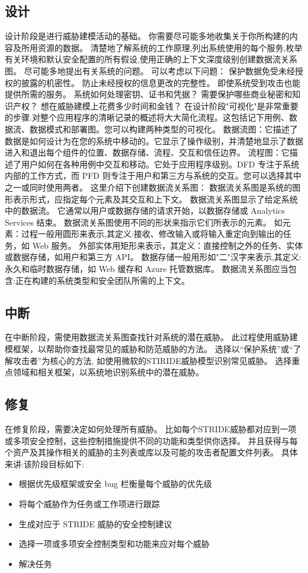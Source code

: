 \subsection[]{设计}
设计阶段是进行威胁建模活动的基础。 你需要尽可能多地收集关于你所构建的内容及所用资源的数据。
清楚地了解系统的工作原理,列出系统使用的每个服务,枚举有关环境和默认安全配置的所有假设,使用正确的上下文深度级别创建数据流关系图。
尽可能多地提出有关系统的问题。 可以考虑以下问题：
保护数据免受未经授权的披露的机密性。
防止未经授权的信息更改的完整性。
即使系统受到攻击也能提供所需的服务。
系统如何处理密钥、证书和凭据？
需要保护哪些商业秘密和知识产权？
想在威胁建模上花费多少时间和金钱？
\newline
在设计阶段"可视化"是非常重要的步骤.对整个应用程序的清晰记录的概述将大大简化流程。这包括记下用例、数据流、数据模式和部署图。您可以构建两种类型的可视化。
数据流图：它描述了数据是如何设计为在您的系统中移动的。它显示了操作级别，并清楚地显示了数据进入和退出每个组件的位置、数据存储、流程、交互和信任边界。 
流程图：它描述了用户如何在各种用例中交互和移动。它处于应用程序级别。DFD 专注于系统内部的工作方式，而 PFD 则专注于用户和第三方与系统的交互。您可以选择其中之一或同时使用两者。
这里介绍下创建数据流关系图： 数据流关系图是系统的图形表示形式，应指定每个元素及其交互和上下文。
数据流关系图显示了给定系统中的数据流。 它通常以用户或数据存储的请求开始，以数据存储或 Analytics Services 结束。 数据流关系图使用不同的形状来指示它们所表示的元素。
如元素：过程一般用圆形来表示,其定义:接收、修改输入或将输入重定向到输出的任务，如 Web 服务。
外部实体用矩形来表示，其定义：直接控制之外的任务、实体或数据存储，如用户和第三方 API。
数据存储一般用形如"二"汉字来表示,其定义:永久和临时数据存储，如 Web 缓存和 Azure 托管数据库。
数据流关系图应当包含:正在构建的系统类型和安全团队所需的上下文。	

\subsection[]{中断}
在中断阶段，需使用数据流关系图查找针对系统的潜在威胁。 此过程使用威胁建模框架，以帮助你查找最常见的威胁和防范威胁的方法。
选择以“保护系统”或“了解攻击者”为核心的方法, 如使用微软的STIRIDE威胁模型识别常见威胁。
选择重点领域和相关框架，以系统地识别系统中的潜在威胁。

\subsection[]{修复}

在修复阶段，需要决定如何处理所有威胁。 比如每个STRIDE威胁都对应到一项或多项安全控制，这些控制措施提供不同的功能和类型供你选择。
并且获得与每个资产及其操作相关的威胁的主列表或库以及可能的攻击者配置文件列表。
具体来讲:该阶段目标如下:
\begin{itemize}
    \item 根据优先级框架或安全 bug 栏衡量每个威胁的优先级
    \item 将每个威胁作为任务或工作项进行跟踪
    \item 生成对应于 STRIDE 威胁的安全控制建议
    \item 选择一项或多项安全控制类型和功能来应对每个威胁
    \item 解决任务
  \end{itemize}

